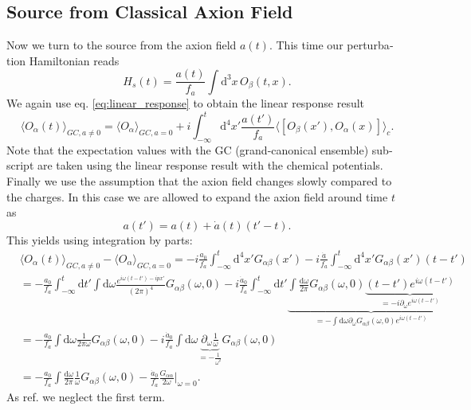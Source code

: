 \documentclass[master,       %
               twoside,        %
               BCOR10mm,       %
               english,ngerman, %
               ]{GAUBM}
\begin{document}
\begin{otherlanguage}{english}
\subsection{Source from Classical Axion Field}
Now we turn to the source from the axion field $a(t)$.
This time our perturbation Hamiltonian reads
\begin{equation}
	H_s(t) = \frac{a(t)}{f_a} \int \mathrm{d}^3 x \, O_\beta(t, x).
\end{equation}
We again use eq. \eqref{eq:linear_response} to obtain the linear response result
\begin{equation}
	\langle O_\alpha(t) \rangle_{GC, a \ne 0} = \langle O_\alpha \rangle_{GC, a = 0} + i \int_{-\infty}^t \mathrm{d}^4 x' \frac{a(t')}{f_a} \langle [ O_\beta(x'), O_\alpha(x)] \rangle_c.
\end{equation}
Note that the expectation values with the GC (grand-canonical ensemble) subscript are taken using the linear response result with the chemical potentials.
Finally we use the assumption that the axion field changes slowly compared to the charges. In this case we are allowed to expand the axion field
around time $t$ as
\begin{equation}
	a(t') = a(t) + \dot{a}(t)(t' - t).
\end{equation}
This yields using integration by parts:
\begin{align}
	 &\langle O_\alpha(t) \rangle_{GC, a \ne 0} - \langle O_\alpha  \rangle_{GC, a = 0} = - i \frac{a_0}{f_a} \int_{-\infty}^t \mathrm{d}^4 x' G_{\alpha \beta}(x') - i \frac{\dot{a}}{f_a} \int_{-\infty}^t \mathrm{d}^4 x' G_{\alpha \beta}(x') (t - t')
	 \nonumber \\
	 &= - \frac{a_0}{f_a} \int_{-\infty}^t \mathrm{d} t' \int \mathrm{d} \omega \frac{e^{i \omega (t - t') - i p x'}}{(2\pi)^4} G_{\alpha \beta}(\omega, 0)
	 -i \frac{\dot{a}_0}{f_a} \int_{-\infty}^t \mathrm{d} t' \underbrace{\int \frac{\mathrm{d} \omega}{2 \pi} G_{\alpha \beta}(\omega, 0) \underbrace{(t - t') e^{i \omega (t - t')}}_{= -i \partial_\omega e^{i \omega (t - t')}}}_{= - \int \mathrm{d} \omega \partial_\omega G_{\alpha \beta}(\omega, 0) e^{i \omega (t - t')}}
	 \nonumber \\
	 &= - \frac{a_0}{f_a} \int \mathrm{d} \omega \frac{1}{2 \pi \omega} G_{\alpha \beta}(\omega, 0) - i \frac{\dot{a}_0}{f_a} \int \mathrm{d} \omega \underbrace{\partial_\omega \frac{1}{\omega}}_{= - \frac{1}{\omega^2}} G_{\alpha \beta}(\omega, 0) \nonumber \\
	 &= - \frac{a_0}{f_a} \int \frac{\mathrm{d} \omega}{2 \pi} \frac{1}{\omega} G_{\alpha \beta}(\omega, 0) - \frac{\dot{a}_0}{f_a} \frac{G_{\alpha \alpha}}{2 \omega} \Big|_{\omega = 0}.
	 \label{eq:axion_source_term_linear_response}
\end{align}
As ref. \cite{Domcke:2020kcp_Generic_Couplings} we neglect the first term.


\end{otherlanguage}
\end{document}
